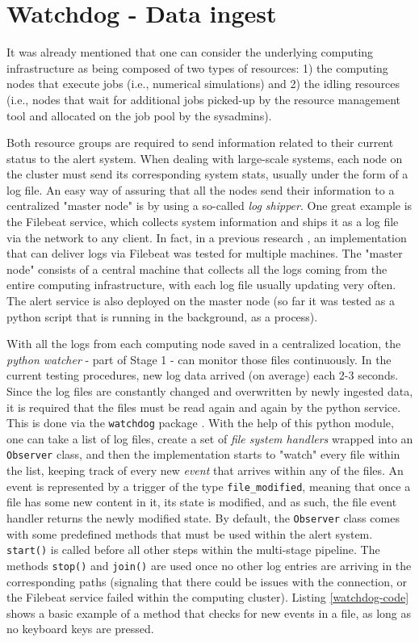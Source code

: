 \documentclass[conference]{IEEEtran}
\begin{document}
\section{Watchdog - Data ingest}
\label{section-data-ingest}

It was already mentioned that one can consider the underlying computing infrastructure as being composed of two types of resources: 1) the computing nodes that execute jobs (i.e., numerical simulations) and 2) the idling resources (i.e., nodes that wait for additional jobs picked-up by the resource management tool and allocated on the job pool by the sysadmins).
\par Both resource groups are required to send information related to their current status to the alert system. When dealing with large-scale systems, each node on the cluster must send its corresponding system stats, usually under the form of a log file. An easy way of assuring that all the nodes send their information to a centralized "master node" is by using a so-called \emph{log shipper}. One great example is the Filebeat \cite{filebeat} service, which collects system information and ships it as a log file via the network to any client. In fact, in a previous research \cite{poenaru-elk}, an implementation that can deliver logs via Filebeat was tested for multiple machines. The "master node" consists of a central machine that collects all the logs coming from the entire computing infrastructure, with each log file usually updating very often. The alert service is also deployed on the master node (so far it was tested as a python script that is running in the background, as a process).
\par With all the logs from each computing node saved in a centralized location, the \emph{python watcher} - part of Stage 1 - can monitor those files continuously. In the current testing procedures, new log data arrived (on average) each 2-3 seconds. Since the log files are constantly changed and overwritten by newly ingested data, it is required that the files must be read again and again by the python service. This is done via the \texttt{watchdog} package \cite{watchdog}. With the help of this python module, one can take a list of log files, create a set of \emph{file system handlers} wrapped into an \texttt{Observer} class, and then the implementation starts to "watch" every file within the list, keeping track of every new \emph{event} that arrives within any of the files. An event is represented by a trigger of the type \texttt{file\_modified}, meaning that once a file has some new content in it, its state is modified, and as such, the file event handler returns the newly modified state. By default, the \texttt{Observer} class comes with some predefined methods that must be used within the alert system. \texttt{start()} is called before all other steps within the multi-stage pipeline. The methods \texttt{stop()} and \texttt{join()} are used once no other log entries are arriving in the corresponding paths (signaling that there could be issues with the connection, or the Filebeat service failed within the computing cluster). Listing \ref{watchdog-code} shows a basic example of a method that checks for new events in a file, as long as no keyboard keys are pressed.
\end{document}
